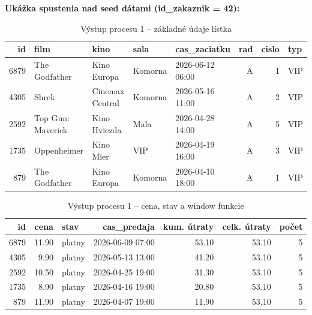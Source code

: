 \documentclass[11pt, a4paper]{article}
\begin{document}
\textbf{Ukážka spustenia nad seed dátami (id\_zakaznik = 42):}

\vspace{0.5em}
\begin{table}[H]
\centering
\caption*{Výstup procesu 1 – základné údaje lístka}
\small
\begin{tabular}{r l l l l r r l}
\toprule
\textbf{id} & \textbf{film} & \textbf{kino} & \textbf{sala} & \textbf{cas\_zaciatku} & \textbf{rad} & \textbf{cislo} & \textbf{typ} \\
\midrule
6879 & The Godfather     & Kino Europa     & Komorna & 2026-06-12 06:00 & A & 1 & VIP \\
4305 & Shrek             & Cinemax Central & Komorna & 2026-05-16 11:00 & A & 2 & VIP \\
2592 & Top Gun: Maverick & Kino Hviezda    & Mala    & 2026-04-28 14:00 & A & 5 & VIP \\
1735 & Oppenheimer       & Kino Mier       & VIP     & 2026-04-19 16:00 & A & 3 & VIP \\
879  & The Godfather     & Kino Europa     & Komorna & 2026-04-10 18:00 & A & 1 & VIP \\
\bottomrule
\end{tabular}
\end{table}

\begin{table}[H]
\centering
\caption*{Výstup procesu 1 – cena, stav a window funkcie}
\small
\begin{tabular}{r r l r r r r}
\toprule
\textbf{id} & \textbf{cena} & \textbf{stav} & \textbf{cas\_predaja} & \textbf{kum. útraty} & \textbf{celk. útraty} & \textbf{počet} \\
\midrule
6879 & 11.90 & platny & 2026-06-09 07:00 & 53.10 & 53.10 & 5 \\
4305 &  9.90 & platny & 2026-05-13 13:00 & 41.20 & 53.10 & 5 \\
2592 & 10.50 & platny & 2026-04-25 19:00 & 31.30 & 53.10 & 5 \\
1735 &  8.90 & platny & 2026-04-16 19:00 & 20.80 & 53.10 & 5 \\
879  & 11.90 & platny & 2026-04-07 19:00 & 11.90 & 53.10 & 5 \\
\bottomrule
\end{tabular}
\end{table}
\end{document}
